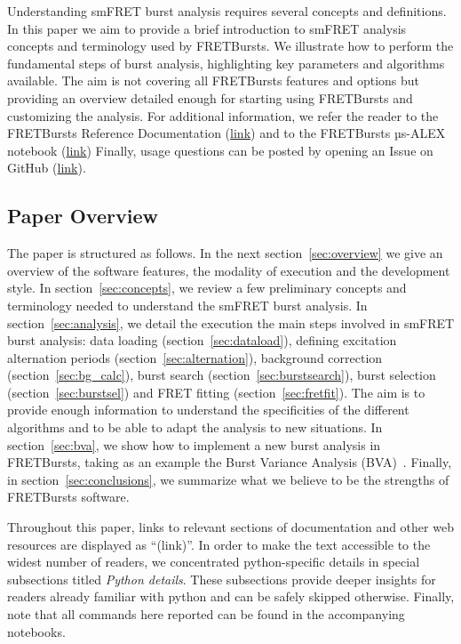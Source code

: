 Understanding smFRET burst analysis requires several concepts and definitions.
In this paper we aim to provide a brief introduction to smFRET analysis concepts
and terminology used by FRETBursts. We illustrate how to perform
the fundamental steps of burst analysis, highlighting key parameters
and algorithms available. The aim is not covering all FRETBursts
features and options but providing an overview detailed enough for starting
using FRETBursts and customizing the analysis. For additional information, 
we refer the reader to the FRETBursts Reference Documentation
(\href{http://fretbursts.readthedocs.org/}{link}) and to
the FRETBursts µs-ALEX notebook
(\href{http://nbviewer.ipython.org/github/tritemio/FRETBursts\_notebooks/blob/master/notebooks/FRETBursts\%20-\%20us-ALEX\%20smFRET\%20burst\%20analysis.ipynb}{link})
Finally, usage questions can be posted by  opening an Issue
on GitHub (\href{https://github.com/tritemio/FRETBursts}{link}).

\subsection{Paper Overview}

The paper is structured as follows.
In the next section~\ref{sec:overview} we give an overview of the software features,
the modality of execution and the development style.
In section~\ref{sec:concepts}, we
review a few preliminary concepts and terminology needed
to understand the smFRET burst analysis.
In section~\ref{sec:analysis}, we detail the execution the main steps involved
in smFRET burst analysis: data loading (section~\ref{sec:dataload}), defining
excitation alternation periods (section~\ref{sec:alternation}), background
correction (section~\ref{sec:bg_calc}), burst search (section~\ref{sec:burstsearch}),
burst selection (section~\ref{sec:burstsel}) and FRET fitting (section~\ref{sec:fretfit}).
The aim is to provide enough information to understand the specificities of
the different algorithms and to be able to adapt the analysis to new situations.
In section~\ref{sec:bva}, we show how to implement a new burst analysis in FRETBursts,
taking as an example the Burst Variance Analysis (BVA)~\cite{Torella_2011}.
Finally, in section~\ref{sec:conclusions}, we summarize what we believe to be
the strengths of FRETBursts software.

Throughout this paper,
links to relevant sections of documentation and other web resources
are displayed as ``(link)''.
In order to make the text accessible to the widest number of readers,
we concentrated python-specific details in special subsections titled
\textit{Python details}. These subsections provide deeper insights for readers
already familiar with python and can be safely skipped otherwise. 
Finally, note that all commands here reported can be found in the 
accompanying notebooks.

